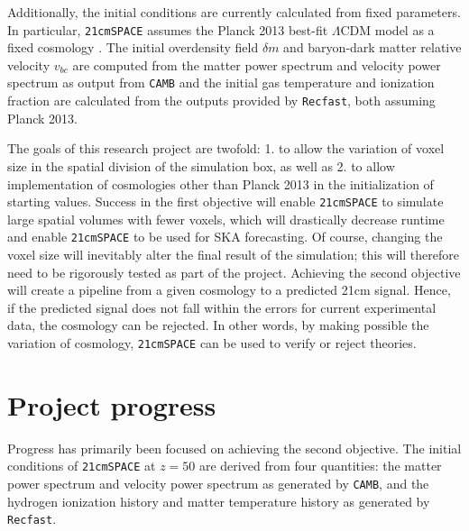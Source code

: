 \documentclass[floats,floatfix,showpacs,amssymb,prd,superscriptaddress,nofootinbib]{revtex4-2} %
\newcommand{\code}{\texttt}
\begin{document}
Additionally, the initial conditions are currently calculated from fixed parameters. In particular, \code{21cmSPACE} assumes the Planck 2013 best-fit $\Lambda$CDM model as a fixed cosmology \cite{gessey-jones_2024}. The initial overdensity field $\delta m$ and baryon-dark matter relative velocity $v_{bc}$ are computed from the matter power spectrum and velocity power spectrum as output from \code{CAMB} and the initial gas temperature and ionization fraction are calculated from the outputs provided by \code{Recfast}, both assuming Planck 2013.

The goals of this research project are twofold: 1. to allow the variation of voxel size in the spatial division of the simulation box, as well as 2. to allow implementation of cosmologies other than Planck 2013 in the initialization of starting values. Success in the first objective will enable \code{21cmSPACE} to simulate large spatial volumes with fewer voxels, which will drastically decrease runtime and enable \code{21cmSPACE} to be used for SKA forecasting. Of course, changing the voxel size will inevitably alter the final result of the simulation; this will therefore need to be rigorously tested as part of the project. Achieving the second objective will create a pipeline from a given cosmology to a predicted 21cm signal. Hence, if the predicted signal does not fall within the errors for current experimental data, the cosmology can be rejected. In other words, by making possible the variation of cosmology, \code{21cmSPACE} can be used to verify or reject theories.

\section{Project progress}
Progress has primarily been focused on achieving the second objective. The initial conditions of \code{21cmSPACE} at $z = 50$ are derived from four quantities: the matter power spectrum and velocity power spectrum as generated by  \code{CAMB}, and the hydrogen ionization history and matter temperature history as generated by \code{Recfast}. 

\end{document}
